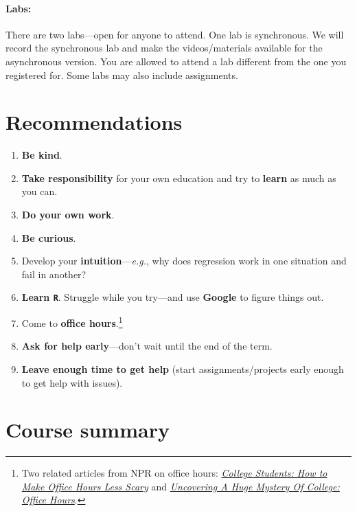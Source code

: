 \documentclass[10pt]{article}
\begin{document}
\paragraph{Labs:} There are two labs---open for anyone to attend. One lab is synchronous. We will record the synchronous lab and make the videos/materials available for the asynchronous version. You are allowed to attend a lab different from the one you registered for. Some labs may also include assignments.

\section*{Recommendations}

\begin{enumerate}
  \item \textbf{Be kind}.
  \item \textbf{Take responsibility} for your own education and try to \textbf{learn} as much as you can.
  \item \textbf{Do your own work}.
  \item \textbf{Be curious}.
  \item Develop your \textbf{intuition}---\textit{e.g.}, why does regression work in one situation and fail in another?
  \item \textbf{Learn \texttt{R}}. Struggle while you try---and use \textbf{Google} to figure things out.
  \item Come to \textbf{office hours}.\footnote{Two related articles from NPR on office hours: \href{https://www.npr.org/2019/10/05/678815966/college-students-how-to-make-office-hours-less-scary}{\textit{College Students: How to Make Office Hours Less Scary}} and \href{https://www.npr.org/2019/10/02/766568824/uncovering-a-huge-mystery-of-college-office-hours}{\textit{Uncovering A Huge Mystery Of College: Office Hours}}.}
  \item \textbf{Ask for help early}---don't wait until the end of the term.
  \item \textbf{Leave enough time to get help} (start assignments/projects early enough to get help with issues).
\end{enumerate}

\section*{Course summary}
\end{document}

